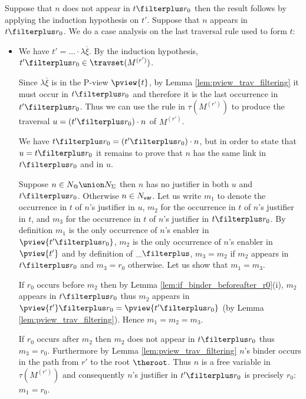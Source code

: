     Suppose that $n$ does not appear in $t \filterplus r_0$ then
    the result follows by applying the induction hypothesis on $t'$.
    Suppose that $n$ appears in $t \filterplus r_0$.
    We do a case analysis on the last traversal rule used to form $t$:

  \begin{itemize}
    \item {}
        We have $t' = \ldots \cdot \lambda \overline{\xi}$. By the
        induction hypothesis, $t' \filterplus r_0 \in
        \travset(M^{(r')})$.

        Since $\lambda \overline{\xi}$ is in the P-view $\pview{t}$,
        by Lemma \ref{lem:pview_trav_filtering} it must occur in
        $t\filterplus r_0$ and therefore it is the last occurrence
        in $t'\filterplus r_0$. Thus we can use the rule
         in $\tau(M^{(r')})$ to produce the traversal
        $u = (t'\filterplus r_0) \cdot n$ of $M^{(r')}$.

        We have $t \filterplus r_0 = (t'\filterplus r_0) \cdot n$,
         but in order to state that $u = t \filterplus r_0$
         it remains to prove that $n$ has the same link in $t \filterplus r_0$ and in $u$.

        Suppose $n \in N_@ \union N_\Sigma$ then $n$ has no justifier in both $u$ and $t\filterplus r_0$.
        Otherwise $n \in N_{\sf var}$.
        Let us write $m_1$ to denote the occurrence in $t$ of $n$'s justifier in $u$,
        $m_2$ for the occurrence in $t$ of $n$'s justifier in $t$,
        and $m_3$ for the occurrence in $t$ of $n$'s justifier in $t \filterplus r_0$.
        By definition $m_1$ is the only occurrence of $n$'s enabler in $\pview{t'\filterplus r_0}$,
        $m_2$ is the only occurrence of $n$'s enabler in $\pview{t'}$
        and by definition of $\_ \filterplus$, $m_3 = m_2$ if $m_2$ appears in
        $t \filterplus r_0$ and $m_3 = r_0$ otherwise.
        Let us show that $m_1 = m_3$.

        If $r_0$ occurs before $m_2$ then by Lemma \ref{lem:if_binder_beforeafter_r0}(i), $m_2$ appears in $t \filterplus r_0$ thus
        $m_2$ appears in $\pview{t'} \filterplus r_0 = \pview{t'\filterplus r_0}$ (by Lemma \ref{lem:pview_trav_filtering}). Hence $m_1 = m_2 = m_3$.

        If $r_0$ occurs after $m_2$ then $m_2$ does not appear in $t\filterplus r_0$ thus $m_3 = r_0$.
        Furthermore by Lemma \ref{lem:pview_trav_filtering}
    $n$'s binder occurs in the path from $r'$ to the root $\theroot$. Thus
    $n$ is a free variable in $\tau(M^{(r')})$ and consequently
    $n$'s justifier in $t'\filterplus r_0$ is precisely $r_0$: $m_1 = r_0$.


\end{itemize}
